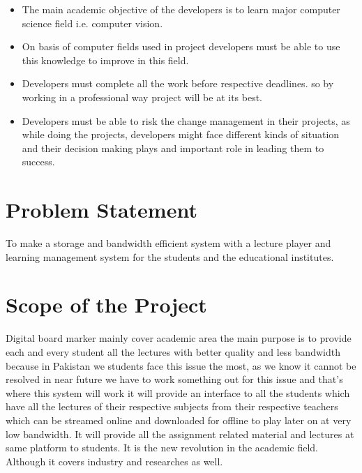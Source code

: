 \begin{itemize}

\item The main academic objective of the developers is to learn major computer science field i.e. computer vision.

\item On basis of computer fields used in project developers must be able to use this knowledge to improve in this field.

\item Developers must complete all the work before respective deadlines. so by working in a professional way project will be at its best.

\item Developers must be able to risk the change management in their projects, as while doing the projects, developers might face different kinds of situation and their decision making plays and important role in leading them to success.

\end{itemize}


\section{Problem Statement}
To make a storage and bandwidth efficient system with a lecture player and learning management system for the students and the educational institutes.
\bigskip

\section{Scope of the Project}
Digital board marker mainly cover academic area the main purpose is to provide each and every student all the lectures with better quality and less bandwidth because in Pakistan we students face this issue the most, as we know it cannot be resolved in near future we have to work something out for this issue and that’s where this system will work it will provide an interface to all the students which have all the lectures of their respective subjects from their respective teachers which can be streamed online and downloaded for offline to play later on at very low bandwidth. It will provide all the assignment related material and lectures at same platform to students. It is the new revolution in the academic field. Although it covers industry and researches as well.
























